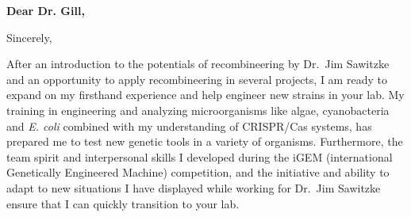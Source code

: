 \documentclass[11pt,a4paper,sans]{moderncv}
\begin{document}
\thispagestyle{titlepage}
\date{\today}
\opening{\textbf{Dear Dr. Gill,}}
\closing{Sincerely,\vspace{-5mm}}
\makelettertitle
\begin{spacing}{1.2}
\vspace{-4mm}
After an introduction to the potentials of recombineering by Dr.\ Jim Sawitzke and an opportunity to apply recombineering in several projects, I am ready to expand on my firsthand experience and help engineer new strains in your lab. %
My training in engineering and analyzing microorganisms like algae, cyanobacteria and \textit{E. coli} combined with my understanding of CRISPR/Cas systems, has prepared me to test new genetic tools in a variety of organisms.
Furthermore, the team spirit and interpersonal skills I developed during the iGEM (international Genetically Engineered Machine) competition, and the initiative and ability to adapt to new situations I have displayed while working for Dr.\ Jim Sawitzke ensure that I can quickly transition to your lab.\par %
\vspace*{1.5mm}


\end{spacing}
\end{document}

